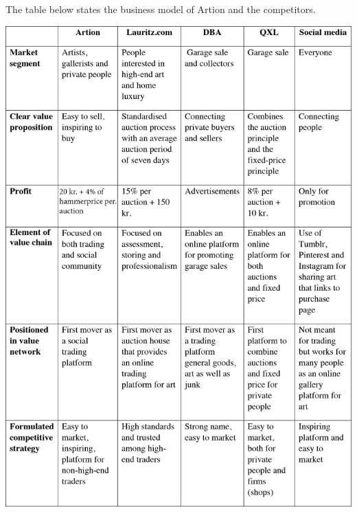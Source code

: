 The table below states the business model of Artion and the competitors. 

\begin{center}
\includegraphics[width=15cm]{Appendix/BusinessModelsV2.png}
\end{center}